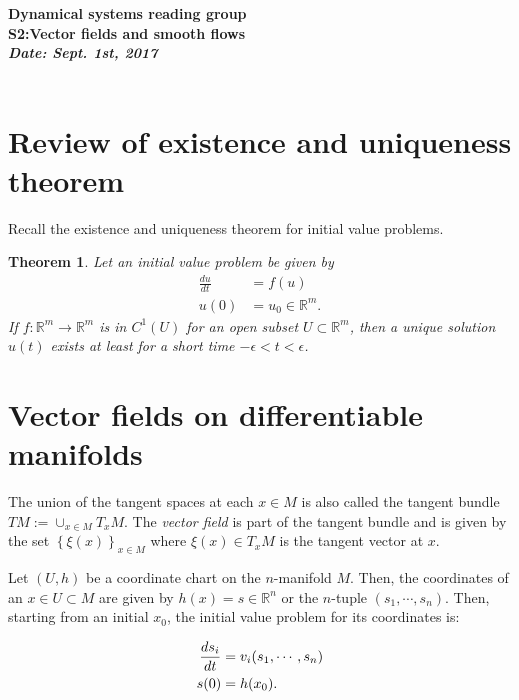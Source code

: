 \documentclass[11pt]{article}
\newtheorem{theorem}{Theorem}[section]
\begin{document}
\begin{center}
{\large \bf	Dynamical systems reading group \\[1ex]
			S2:Vector fields and smooth flows
\\[2ex]
	   	{\it Date: Sept. 1st, 2017} \hfill \\[-1.5ex]	  
 	\hrulefill \\
				
}
\end{center}


\section{Review of existence and uniqueness theorem }

Recall the existence and uniqueness theorem for initial value problems. 
\begin{theorem}
Let an initial value problem be given by 
\begin{align}
		\frac{du}{dt} &= f(u) \\
		u(0) &= u_0 \in \mathbb{R}^m. 
\end{align}
If $f:\mathbb{R}^m \to \mathbb{R}^m$ is in $C^1(U)$ for an open subset $U \subset \mathbb{R}^m$, then a unique solution $u(t)$
exists at least for a short time $-\epsilon < t < \epsilon$.
\label{thm:ivp}
\end{theorem}

\section{Vector fields on differentiable manifolds}

The union of the tangent spaces at each $x \in M$ is also called
the tangent bundle $TM := \cup_{x \in M} T_x M$. The \emph{vector field}
is part of the tangent bundle and is given by the set $\left\{\xi(x)\right\}_{x\in M}$
where $\xi(x) \in T_x M$ is the tangent vector at $x$. 

Let $(U,h)$ be a coordinate chart on the $n$-manifold $M$. Then, the coordinates
of an $x \in U \subset M$ are given by $h(x) = s \in \mathbb{R}^n$ or the 
$n$-tuple $(s_1,\cdots,s_n)$. Then, 
starting from an initial $x_0$, the initial value problem for its 
coordinates is:

\begin{align}
\notag \frac{d s_i}{dt} &= v_i(s_1,\cdots,s_n) \\
s(0) &= h(x_0).
\label{eqn:ivp}
\end{align}    
\end{document}
